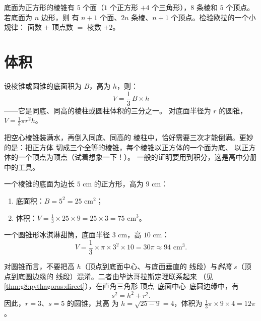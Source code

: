 \begin{example}[数面、棱与顶点]\label{ex:g8:solids:count}
底面为正方形的棱锥有 $5$ 个面（$1$ 个正方形 $+ 4$
个三角形），$8$ 条棱和 $5$ 个顶点。若底面为 $n$ 边形，则
有 $n + 1$ 个面、$2n$ 条棱、$n + 1$ 个顶点。检验欧拉的一个小规律：
面数 $+$ 顶点数 $=$ 棱数 $+ 2$。
\end{example}

\section{体积}

\begin{theorem}[棱锥与圆锥的体积]\label{thm:g8:solids:volume}
设棱锥或圆锥的底面积为 $B$，高为 $h$，则：
\[
V = \frac{1}{3}\, B \times h
\]
——它是同底、同高的棱柱或圆柱体积的三分之一。
对底面半径为 $r$ 的圆锥，$V = \frac13 \pi r^2 h$。
\end{theorem}
\admitted

\begin{remark}[为什么是三分之一？]
把空心棱锥装满水，再倒入同底、同高的
棱柱中，恰好需要三次才能倒满。更妙的是：把正方体
切成三个全等的棱锥，每个棱锥以正方体的一个面为底、
以正方体的一个顶点为顶点（试着想象一下！）。
一般的证明要用到积分，这是高中分册中的工具。
\end{remark}

\begin{example}\label{ex:g8:solids:volume}
一个棱锥的底面为边长 $5$ cm 的正方形，高为 $9$ cm：
\begin{enumerate}
  \item 底面积：$B = 5^2 = 25$ cm$^2$；
  \item 体积：$V = \frac13 \times 25 \times 9 = 25 \times 3 = 75$
        cm$^3$。
\end{enumerate}
一个圆锥形冰淇淋甜筒，底面半径 $3$ cm，高 $10$ cm：
\[
V = \frac13 \times \pi \times 3^2 \times 10 = 30\pi \approx 94
\text{ cm}^3 .
\]
\end{example}

\begin{example}[注意区分高]\label{ex:g8:solids:slant}
对圆锥而言，不要把高 $h$（顶点到底面中心、与底面垂直的
线段）与\emph{斜高} $s$（顶点到底圆边缘的
线段）混淆。二者由毕达哥拉斯定理联系起来
（见\cref{thm:g8:pythagoras:direct}），在直角三角形
顶点–底面中心–底圆边缘中，有
\[
s^2 = h^2 + r^2 .
\]
因此，$r = 3$、$s = 5$ 的圆锥，其高
为 $h = \sqrt{25 - 9} = 4$，体积为
$\frac13 \pi \times 9 \times 4 = 12\pi$。
\end{example}

